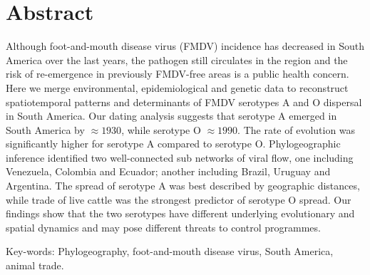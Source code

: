 \documentclass[10pt]{article}
\begin{document}
\section*{Abstract}
Although foot-and-mouth disease virus (FMDV) incidence has decreased in South America over the last years, the pathogen still circulates in the region and the risk of re-emergence in previously FMDV-free areas is a public health concern.
Here we merge environmental, epidemiological and genetic data to reconstruct spatiotemporal patterns and determinants of FMDV serotypes A and O dispersal in South America.
Our dating analysis suggests that serotype A emerged in South America by $\approx1930$, while serotype O $\approx1990$.
The rate of evolution was significantly higher for serotype A compared to serotype O.
Phylogeographic inference identified two well-connected sub networks of viral flow, one including Venezuela, Colombia and Ecuador; another including Brazil, Uruguay and Argentina.
The spread of serotype A was best described by geographic distances, while trade of live cattle was the strongest predictor of serotype O spread.
Our findings show that the two serotypes have different underlying evolutionary and spatial dynamics and may pose different threats to control programmes.

Key-words: Phylogeography, foot-and-mouth disease virus, South America, animal trade.

\end{document}
